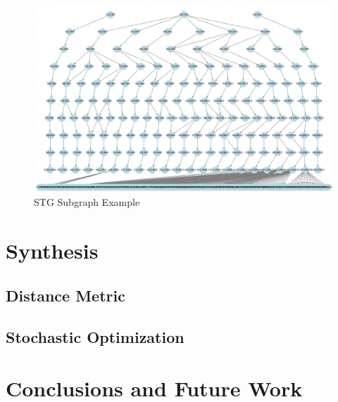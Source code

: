 \documentclass{article}
\begin{document}
\begin{figure}[h!]
  \centering
  \includegraphics[width=\linewidth]{figs/stg_full}
  \caption{STG Subgraph Example}
  \label{fig:stg_full}
\end{figure}

\section{Synthesis}\label{sec:synthesis}
\subsection{Distance Metric}\label{subsec:dist_metric}
\subsection{Stochastic Optimization}\label{subsec:stoch_opt}


\section{Conclusions and Future Work}


\end{document}
